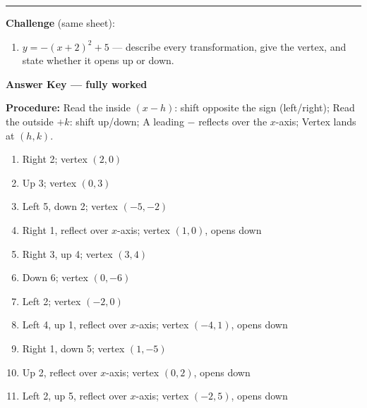\documentclass[12pt]{article}
\begin{document}
\vspace{0.2cm}\hrule\vspace{0.3cm}
\textbf{Challenge} (same sheet):\\[4pt]
\begin{enumerate}[label=\textbf{\arabic*.}, start=11, itemsep=2.2cm]
  \item $y=-(x+2)^{2}+5$ --- describe every transformation, give the vertex, and state whether it opens up or down.
\end{enumerate}

\newpage

\begin{center}{\Large \textbf{Answer Key --- fully worked}}\end{center}
\vspace{0.25cm}
\textbf{Procedure:} Read the inside $(x-h)$: shift opposite the sign (left/right); Read the outside $+k$: shift up/down; A leading $-$ reflects over the $x$-axis; Vertex lands at $(h,k)$.\\[8pt]
\begin{enumerate}[label=\textbf{\arabic*.},itemsep=7pt]
  \item Right 2; vertex $(2,0)$
  \item Up 3; vertex $(0,3)$
  \item Left 5, down 2; vertex $(-5,-2)$
  \item Right 1, reflect over $x$-axis; vertex $(1,0)$, opens down
  \item Right 3, up 4; vertex $(3,4)$
  \item Down 6; vertex $(0,-6)$
  \item Left 2; vertex $(-2,0)$
  \item Left 4, up 1, reflect over $x$-axis; vertex $(-4,1)$, opens down
  \item Right 1, down 5; vertex $(1,-5)$
  \item Up 2, reflect over $x$-axis; vertex $(0,2)$, opens down
  \item Left 2, up 5, reflect over $x$-axis; vertex $(-2,5)$, opens down
\end{enumerate}
\end{document}
